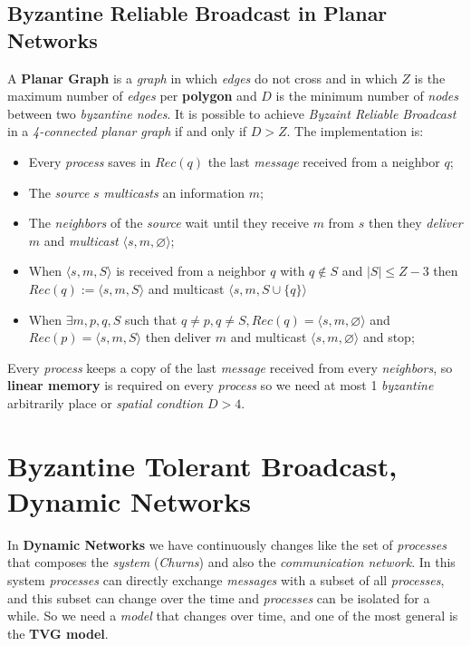 \documentclass{article}
\begin{document}
\subsection{Byzantine Reliable Broadcast in Planar Networks}
A \textbf{Planar Graph} is a \emph{graph} in which \emph{edges} do not cross and in which $Z$ is the maximum number of \emph{edges} per \textbf{polygon} and $D$ is the minimum number of \emph{nodes} between two \emph{byzantine nodes}. It is possible to achieve \emph{Byzaint Reliable Broadcast} in a \emph{4-connected planar graph} if and only if $D>Z$. The implementation is:
\begin{itemize}
\item Every \emph{process} saves in $Rec(q)$ the last \emph{message} received from a neighbor $q$;
\item The \emph{source} $s$ \emph{multicasts} an information $m$;
\item The \emph{neighbors} of the \emph{source} wait until they receive $m$ from $s$ then they \emph{deliver} $m$ and \emph{multicast} $\langle s,m,\varnothing \rangle$;
\item When  $\langle s,m,S \rangle$ is received from a neighbor $q$ with $q \notin S$ and $|S| \leq Z-3$ then $Rec(q) := \langle s,m,S \rangle$ and multicast $\langle s,m,S \cup \{q\}\rangle$ 
\item When $\exists m,p,q,S$ such that $q \neq p, q \neq S, Rec(q) = \langle s,m,\varnothing \rangle$ and $Rec(p) = \langle s,m,S \rangle$ then deliver $m$ and multicast $\langle s,m,\varnothing \rangle$ and stop;
\end{itemize}
Every \emph{process} keeps a copy of the last \emph{message} received from every \emph{neighbors}, so \textbf{linear memory} is required on every \emph{process} so we need at most 1 \emph{byzantine} arbitrarily place or \emph{spatial condtion} $D>4$. 
\section{Byzantine Tolerant Broadcast, Dynamic Networks}
In \textbf{Dynamic Networks} we have continuously changes like the set of \emph{processes} that composes the \emph{system} (\emph{Churns}) and also the \emph{communication network}. In this system \emph{processes} can directly exchange \emph{messages} with a subset of all \emph{processes}, and this subset can change over the time and \emph{processes} can be isolated for a while. So we need a \emph{model} that changes over time, and one of the most general is the \textbf{TVG model}.
\end{document}
